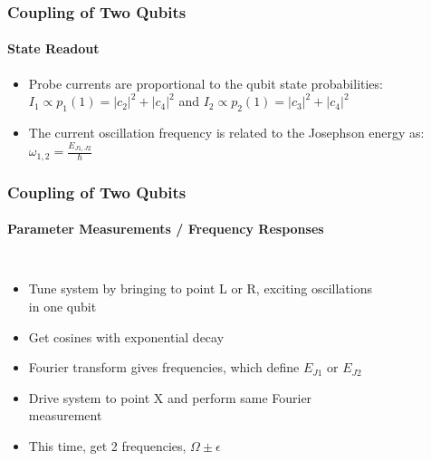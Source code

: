 \documentclass{beamer}
\begin{document}

\begin{frame}
    \frametitle{Coupling of Two Qubits}
    \framesubtitle{State Readout}
    \begin{itemize}
        \item Probe currents are proportional to the qubit state probabilities: $I_1 \propto p_1(1) = |c_2|^2 + |c_4|^2$ and $I_2 \propto p_2(1) = |c_3|^2 + |c_4|^2$
        \item The current oscillation frequency is related to the Josephson energy as: $\omega_{1,2}=\frac{E_{J1,J2}}{\hbar}$
    \end{itemize}
\end{frame}


\begin{frame}
    \frametitle{Coupling of Two Qubits}
    \framesubtitle{Parameter Measurements / Frequency Responses}
    \begin{columns}
            \begin{itemize}
                \fontsize{7}{8}\selectfont
                \item Tune system by bringing to point L or R, exciting oscillations in one qubit
                \item Get cosines with exponential decay
                \item Fourier transform gives frequencies, which define $E_{J1}$ or $E_{J2}$
                \item Drive system to point X and perform same Fourier measurement
                \item This time, get 2 frequencies, $\Omega \pm \epsilon$
            \end{itemize}
            \begin{figure}[ht!]
                \centering

\end{figure}
\end{columns}
\end{frame}
\end{document}
